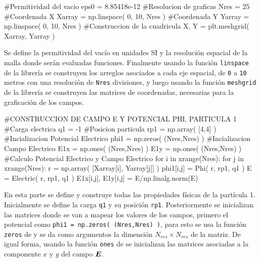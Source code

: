\begin{listing}[style=python, numbers = none]
#Permitividad del vacio
eps0 = 8.85418e-12
#Resolucion de graficas
Nres = 25
#Coordenada X
Xarray = np.linspace( 0, 10, Nres )
#Coordenada Y
Yarray = np.linspace( 0, 10, Nres )
#Construccion de la cuadricula
X, Y = plt.meshgrid( Xarray, Yarray )
\end{listing}
Se define la permitividad del vacío en unidades SI y la resolución
espacial de la malla donde serán evaluadas funciones. Finalmente usando
la función \texttt{linspace} de la librería \numpy se construyen los 
arreglos asociados a cada eje espacial, de \texttt{0} a \texttt{10} metros
con una resolución de \texttt{Nres} divisiones, y luego usando la función
\texttt{meshgrid} de la librería \matplotlib se construyen las matrices de 
coordenadas, necesarias para la graficación de los campos.


\begin{listing}[style=python, numbers = none]
#CONSTRUCCION DE CAMPO E Y POTENCIAL PHI, PARTICULA 1
#Carga electrica
q1 = -1
#Posicion particula
rp1 = np.array( [4,4] )
#Incializacion Potencial Electrico
phi1 = np.zeros( (Nres,Nres) )
#Incializacion Campo Electrico
E1x = np.ones( (Nres,Nres) )
E1y = np.ones( (Nres,Nres) )
#Calculo Potencial Electrico y Campo Electrico
for i in xrange(Nres):
    for j in xrange(Nres):
	r = np.array( [Xarray[i], Yarray[j]] )
	phi1[i,j] = Phi( r, rp1, q1 )
	E = Electric( r, rp1, q1 )
	E1x[i,j], E1y[i,j] = E/np.linalg.norm(E)
\end{listing}
En esta parte se define y construye todas las propiedades físicas de la 
partícula 1. Inicialmente se define la carga \texttt{q1} y su posición
\texttt{rp1}. Posteriormente se inicializan las matrices donde se van a 
mapear los valores de los campos, primero el potencial como \texttt{phi1 = 
np.zeros( (Nres,Nres) )}, para esto se usa la función \texttt{zeros} de 
\numpy y se da como argumentos la dimensión $N_{res}\times N_{res}$ de la
matriz. De igual forma, usando la función \texttt{ones} de \numpy se 
inicializan las matrices asociadas a la componente $x$ y $y$ del campo 
$\boldsymbol{ E }$. 

\

